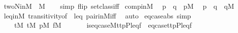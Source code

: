 \begin{isabellebody}
\isanewline
{}\isamarkupfalse%
\ twoN{\isacharunderscore}{\kern0pt}in{\isacharunderscore}{\kern0pt}M\ {\isacharcolon}{\kern0pt}\ {\isachardoublequoteopen}{}{\isasymin}M{\isachardoublequoteclose}\isanewline
%
\isadelimproof
\ \ %
\endisadelimproof
%
\isatagproof
{}\isamarkupfalse%
\ {\isacharparenleft}{\kern0pt}simp\ flip{\isacharcolon}{\kern0pt}\ setclass{\isacharunderscore}{\kern0pt}iff{\isacharparenright}{\kern0pt}%
\endisatagproof
{\isafoldproof}%
%
\isadelimproof
\isanewline
%
\endisadelimproof
\isanewline
{}\isamarkupfalse%
\ comp{\isacharunderscore}{\kern0pt}in{\isacharunderscore}{\kern0pt}M{\isacharcolon}{\kern0pt}\isanewline
\ \ {\isachardoublequoteopen}p\ {\isasympreceq}\ q\ {\isasymLongrightarrow}\ p{\isasymin}M{\isachardoublequoteclose}\isanewline
\ \ {\isachardoublequoteopen}p\ {\isasympreceq}\ q\ {\isasymLongrightarrow}\ q{\isasymin}M{\isachardoublequoteclose}\isanewline
%
\isadelimproof
\ \ %
\endisadelimproof
%
\isatagproof
{}\isamarkupfalse%
\ leq{\isacharunderscore}{\kern0pt}in{\isacharunderscore}{\kern0pt}M\ transitivity{\isacharbrackleft}{\kern0pt}of\ {\isacharunderscore}{\kern0pt}\ leq{\isacharbrackright}{\kern0pt}\ pair{\isacharunderscore}{\kern0pt}in{\isacharunderscore}{\kern0pt}M{\isacharunderscore}{\kern0pt}iff\ \isamarkupfalse%
\ auto%
\endisatagproof
{\isafoldproof}%
%
\isadelimproof
\isanewline
%
\endisadelimproof
\isanewline
\isanewline
\isanewline
{}\isamarkupfalse%
\ eq{\isacharunderscore}{\kern0pt}case{\isacharunderscore}{\kern0pt}abs\ {\isacharbrackleft}{\kern0pt}simp{\isacharbrackright}{\kern0pt}{\isacharcolon}{\kern0pt}\isanewline
\ \ \isanewline
\ \ \ \ {\isachardoublequoteopen}t{}{\isasymin}M{\isachardoublequoteclose}\ {\isachardoublequoteopen}t{}{\isasymin}M{\isachardoublequoteclose}\ {\isachardoublequoteopen}p{\isasymin}M{\isachardoublequoteclose}\ {\isachardoublequoteopen}f{\isasymin}M{\isachardoublequoteclose}\isanewline
\ \ \isanewline
\ \ \ \ {\isachardoublequoteopen}is{\isacharunderscore}{\kern0pt}eq{\isacharunderscore}{\kern0pt}case{\isacharparenleft}{\kern0pt}{\isacharhash}{\kern0pt}{\isacharhash}{\kern0pt}M{\isacharcomma}{\kern0pt}t{}{\isacharcomma}{\kern0pt}t{}{\isacharcomma}{\kern0pt}p{\isacharcomma}{\kern0pt}P{\isacharcomma}{\kern0pt}leq{\isacharcomma}{\kern0pt}f{\isacharparenright}{\kern0pt}\ {\isasymlongleftrightarrow}\ eq{\isacharunderscore}{\kern0pt}case{\isacharparenleft}{\kern0pt}t{}{\isacharcomma}{\kern0pt}t{}{\isacharcomma}{\kern0pt}p{\isacharcomma}{\kern0pt}P{\isacharcomma}{\kern0pt}leq{\isacharcomma}{\kern0pt}f{\isacharparenright}{\kern0pt}{\isachardoublequoteclose}\isanewline

\end{isabellebody}
